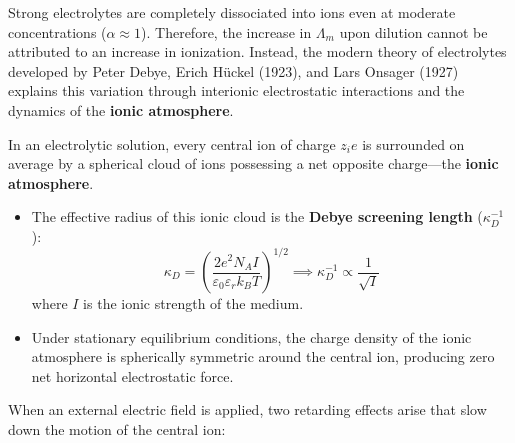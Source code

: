 Strong electrolytes are completely dissociated into ions even at moderate concentrations ($\alpha \approx 1$). Therefore, the increase in $\Lambda_m$ upon dilution cannot be attributed to an increase in ionization. Instead, the modern theory of electrolytes developed by Peter Debye, Erich Hückel (1923), and Lars Onsager (1927) explains this variation through interionic electrostatic interactions and the dynamics of the \textbf{ionic atmosphere}.

\begin{atkinsbox}
In an electrolytic solution, every central ion of charge $z_i e$ is surrounded on average by a spherical cloud of ions possessing a net opposite charge—the \textbf{ionic atmosphere}. 
\begin{itemize}[leftmargin=*]
    \item The effective radius of this ionic cloud is the \textbf{Debye screening length} ($\kappa_D^{-1}$):
    \begin{equation}
        \kappa_D = \left( \frac{2 e^2 N_A I}{\varepsilon_0 \varepsilon_r k_B T} \right)^{1/2} \implies \kappa_D^{-1} \propto \frac{1}{\sqrt{I}}
    \end{equation}
    where $I$ is the ionic strength of the medium.
    \item Under stationary equilibrium conditions, the charge density of the ionic atmosphere is spherically symmetric around the central ion, producing zero net horizontal electrostatic force.
\end{itemize}
\end{atkinsbox}

When an external electric field is applied, two retarding effects arise that slow down the motion of the central ion:

